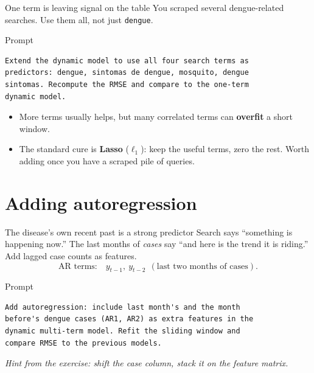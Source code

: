 \documentclass[aspectratio=169,11pt]{beamer}
\begin{document}
\begin{frame}[fragile]{One term is leaving signal on the table}
  You scraped several dengue-related searches. Use them all, not just \texttt{dengue}.
  \begin{block}{Prompt}
  \begin{lstlisting}
Extend the dynamic model to use all four search terms as
predictors: dengue, sintomas de dengue, mosquito, dengue
sintomas. Recompute the RMSE and compare to the one-term
dynamic model.
  \end{lstlisting}
  \end{block}
  \begin{itemize}
    \item More terms usually helps, but many correlated terms can \textbf{overfit} a short
          window.
    \item The standard cure is \textbf{Lasso} ($\ell_1$): keep the useful terms, zero the
          rest. Worth adding once you have a scraped pile of queries.
  \end{itemize}
\end{frame}

\section{Adding autoregression}

\begin{frame}[fragile]{The disease's own recent past is a strong predictor}
  Search says ``something is happening now.'' The last months of \emph{cases} say ``and here
  is the trend it is riding.'' Add lagged case counts as features.
  \[
    \text{AR terms:}\quad y_{t-1},\ y_{t-2}\ \ (\text{last two months of cases}).
  \]
  \begin{block}{Prompt}
  \begin{lstlisting}
Add autoregression: include last month's and the month
before's dengue cases (AR1, AR2) as extra features in the
dynamic multi-term model. Refit the sliding window and
compare RMSE to the previous models.
  \end{lstlisting}
  \end{block}
  \begin{center}
    \itshape Hint from the exercise: shift the case column, stack it on the feature matrix.
  \end{center}
\end{frame}

\end{document}
